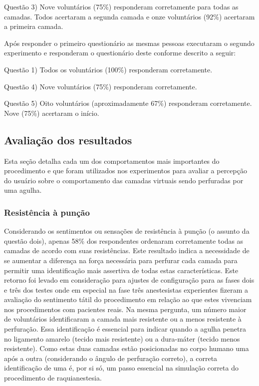 Questão 3) Nove voluntários (75\%) responderam corretamente para todas as camadas. Todos acertaram a segunda camada e onze voluntários (92\%) acertaram a primeira camada. 

Após responder o primeiro questionário as mesmas pessoas executaram o segundo experimento e responderam o questionário deste conforme descrito a seguir:

Questão 1) Todos os voluntários (100\%) responderam corretamente.

Questão 4) Nove voluntários (75\%) responderam corretamente.

Questão 5) Oito voluntários (aproximadamente 67\%) responderam corretamente. Nove (75\%) acertaram o início.

\subsection{Avaliação dos resultados}
\label{sec:avaliacao}

Esta seção detalha cada um dos comportamentos mais importantes do procedimento e que foram utilizados nos experimentos para avaliar a percepção do usuário sobre o comportamento das camadas virtuais sendo perfuradas por uma agulha.

\subsubsection{Resistência à punção}

Considerando os sentimentos ou sensações de resistência à punção (o assunto da questão dois), apenas 58\% dos respondentes ordenaram corretamente todas as camadas de acordo com suas resistências. Este resultado indica a necessidade de se aumentar a diferença na força necessária para perfurar cada camada para permitir uma identificação mais assertiva de todas estas características. Este retorno foi levado em consideração para ajustes de configuração para as fases dois e três dos testes onde em especial na fase três anestesistas experientes fizeram a avaliação do sentimento tátil do procedimento em relação ao que estes vivenciam nos procedimentos com pacientes reais. Na mesma pergunta, um número maior de voluntários identificaram a camada mais resistente ou a menos resistente à perfuração. Essa identificação é essencial para indicar quando a agulha penetra no ligamento amarelo (tecido mais resistente) ou a dura-máter (tecido menos resistente). Como estas duas camadas estão posicionadas no corpo humano uma após a outra (considerando o ângulo de perfuração correto), a correta identificação de uma é, por si só, um passo essencial na simulação correta do procedimento de raquianestesia.

